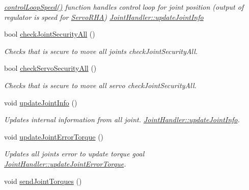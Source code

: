 \begin{DoxyCompactItemize}
\begin{DoxyCompactList}\small\item\em \hyperlink{classJointHandler_adc80ca17f1a1835f16c8045c82b0c06d}{control\+Loop\+Speed()} function handles control loop for joint position (output of regulator is speed for \hyperlink{classServoRHA}{Servo\+R\+HA})  \hyperlink{classJointHandler_a0c52f5090368d69e6c9168ce51c9b8de}{Joint\+Handler\+::update\+Joint\+Info} \end{DoxyCompactList}\item 
bool \hyperlink{classJointHandler_a3e249d868fd829ab13726a5e129e6585}{check\+Joint\+Security\+All} ()
\begin{DoxyCompactList}\small\item\em Checks that is secure to move all joints  check\+Joint\+Security\+All. \end{DoxyCompactList}\item 
bool \hyperlink{classJointHandler_a44f1c7082cb09077fef7f599ec776a6d}{check\+Servo\+Security\+All} ()
\begin{DoxyCompactList}\small\item\em Checks that is secure to move all servo  check\+Joint\+Security\+All. \end{DoxyCompactList}\item 
void \hyperlink{classJointHandler_a0c52f5090368d69e6c9168ce51c9b8de}{update\+Joint\+Info} ()
\begin{DoxyCompactList}\small\item\em Updates internal information from all joint.  \hyperlink{classJointHandler_a0c52f5090368d69e6c9168ce51c9b8de}{Joint\+Handler\+::update\+Joint\+Info}. \end{DoxyCompactList}\item 
void \hyperlink{classJointHandler_ac567fe6ca46f91a3cd6a08888bff54bf}{update\+Joint\+Error\+Torque} ()\hypertarget{classJointHandler_ac567fe6ca46f91a3cd6a08888bff54bf}{}\label{classJointHandler_ac567fe6ca46f91a3cd6a08888bff54bf}

\begin{DoxyCompactList}\small\item\em Updates all joints error to update torque goal  \hyperlink{classJointHandler_ac567fe6ca46f91a3cd6a08888bff54bf}{Joint\+Handler\+::update\+Joint\+Error\+Torque}. \end{DoxyCompactList}\item 
void \hyperlink{classJointHandler_a9c5ad1c7aca5efeba1df8a82de596acf}{send\+Joint\+Torques} ()\hypertarget{classJointHandler_a9c5ad1c7aca5efeba1df8a82de596acf}{}\label{classJointHandler_a9c5ad1c7aca5efeba1df8a82de596acf}


\end{DoxyCompactItemize}
